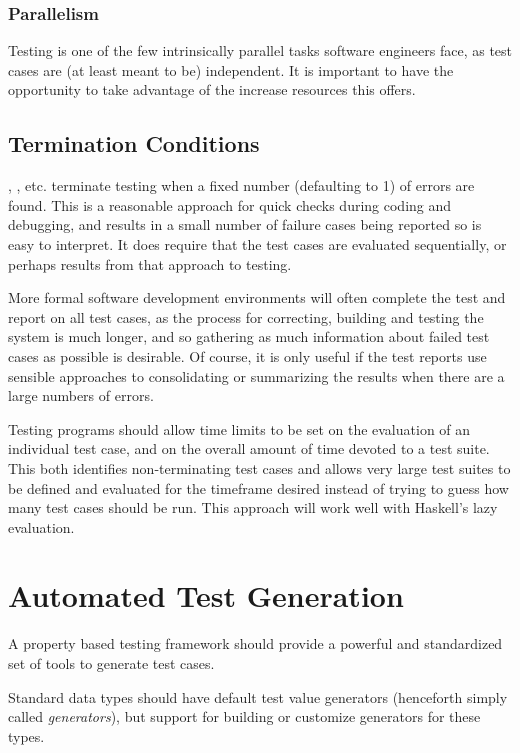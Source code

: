 \subsubsection{Parallelism}
Testing is one of the few intrinsically parallel tasks software engineers face,
as test cases are (at least meant to be) independent.
It is important to have the opportunity to take advantage of the increase resources this offers.

\subsection{Termination Conditions}

\QC, \SC, etc. terminate testing when a fixed number (defaulting to 1) of errors are found.
This is a reasonable approach for quick checks during coding and debugging,
and results in a small number of failure cases being reported so is easy to interpret.
It does require that the test cases are evaluated sequentially,
or perhaps results from that approach to testing.

More formal software development environments
will often complete the test and report on all test cases,
as the process for correcting, building and testing the system is much longer,
and so gathering as much information about failed test cases as possible is desirable.
Of course, it is only useful if the test reports use sensible approaches to 
consolidating or summarizing the results when there are a large numbers of errors.

Testing programs should allow time limits to be set on 
the evaluation of an individual test case,
and on the overall amount of time devoted to a test suite.
This both identifies non-terminating test cases
and allows very large test suites to be defined
and evaluated for the timeframe desired
instead of trying to guess how many test cases should be run.
This approach will work well with Haskell's lazy evaluation.


\section{Automated Test Generation}

A property based testing framework should provide a
powerful and standardized set of tools to generate test cases.

Standard data types should have default test value generators 
(henceforth simply called \emph{generators}), 
but support for building or customize generators for these types.

